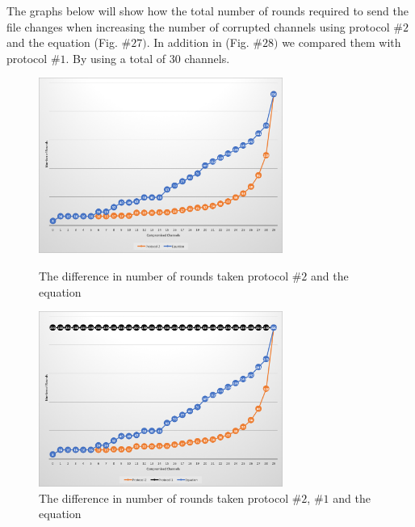 \documentclass[main.tex]{subfiles}
\begin{document}
The graphs below will show how the total number of rounds required to send the file changes when increasing the number of corrupted channels using protocol $\#2$ and the equation (Fig. $\#27)$. In addition in (Fig. $\#28)$ we compared them with protocol $\#1$. By using a total of $30$ channels.
\begin{figure} [!htb]\centering
 \includegraphics[keepaspectratio, width=8cm]{pics/30Pro2Eq.png}
 \caption{The difference in number of rounds taken protocol $\#2$ and the equation}%
 \includegraphics[keepaspectratio, width=8cm]{pics/30Complete.png}
 \caption{The difference in number of rounds taken protocol $\#2$, $\#1$ and the equation}\end{figure}
 
\end{document}
